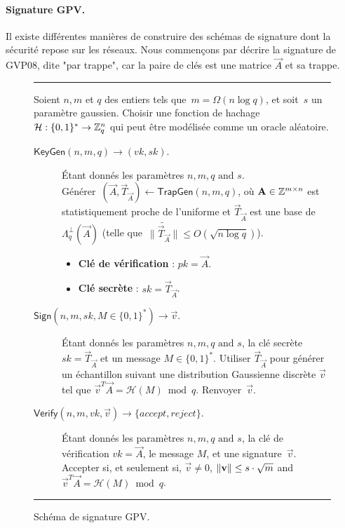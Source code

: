 \paragraph{Signature GPV.}
Il existe différentes manières de construire des schémas de signature dont la sécurité repose sur les réseaux. Nous commençons par décrire la signature de GVP08, dite "par trappe", car la paire de clés est une matrice $\vec{A}$ et sa trappe.

\begin{figure}[htbp]
\rule{\linewidth}{.5pt}
Soient $n, m$ et $q$ des entiers tels que~$m = \Omega (n \log q)$, et soit~$s$ un paramètre gaussien. Choisir une fonction de hachage $\mathcal{H} : \{ 0, 1\}^* \rightarrow \mathbb{Z}_q^n$ qui peut être modélisée comme un oracle aléatoire.
\vspace*{-0.2cm}
\begin{description}
\item[$\mathsf{KeyGen}(n,m,q) \rightarrow (vk,sk)$.] \'Etant donnés les paramètres $n, m, q \text{ and } s$. \\
Générer~$(\vec{A}, \vec{T}_{\vec{A}} ) \leftarrow \mathsf{TrapGen}(n,m,q)$, où $\mathbf{A} \in \mathbb{Z}^{m \times n}$  est statistiquement proche de l'uniforme et $\vec{T}_{\vec{A}}$ est une base de $\Lambda_q^{\perp}(\vec{A})$ (telle que~$\|\widetilde{\vec{T}_{\vec{A}}}\| \leq O(\sqrt{n \log q})$). 
\begin{itemize}
\item \textbf{Clé de vérification} : $pk = \vec{A}$.
\item \textbf{Clé secrète} : $sk = \vec{T}_{\vec{A}}$.
\end{itemize}

\item[$\mathsf{Sign}(n,m,sk,M \in \{0,1\}^{*}) \rightarrow \vec{v} $.] \'Etant donnés les paramètres $n, m, q \text{ and } s$, la clé secrète $sk = \vec{T}_{\vec{A}}$ et un message $M \in \{ 0,1 \}^*$. 
Utiliser $\vec{T}_{\vec{A}}$ pour générer un échantillon suivant une distribution Gaussienne discrète $\vec{v}$ tel que $\vec{v}^T \vec{A} = \mathcal{H}(M) \bmod q$. 
Renvoyer~$\vec{v}$.

\item[$\mathsf{Verify}(n,m,vk,\vec{v})\rightarrow \{ accept ,reject \}$.] \'Etant donnés les paramètres $n, m, q \text{ and } s$, la clé de vérification $vk = \vec{A}$, le message $M$, et une signature~$\vec{v}$. Accepter si, et seulement si,
 $\vec{v} \neq 0$, $\Vert \mathbf{v} \Vert \leq s \cdot \sqrt{m}$ and $\vec{v}^T \vec{A} = \mathcal{H}(M) \bmod q$.  
\end{description}
\vspace*{-0.5cm}
\rule{\linewidth}{.1pt} %
\caption{Schéma de signature GPV.}
    \label{fig:GPVSign}
\end{figure}

